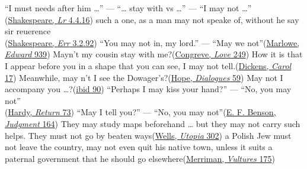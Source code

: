 \ea \label{ex:08-93}
\ea
``I must needs after him {\dots}'' --- ``{\dots} stay with vs {\dots}'' --- ``I may not {\dots}''\\\hfill(\href{https://internetshakespeare.uvic.ca/doc/Lr_F1/scene/4.4/index.html#tln-2400}{Shakespeare, \textit{Lr} 4.4.16}) %
\ex
such a one, as a man may not speake of, without he say sir reuerence\\\hfill(\href{https://internetshakespeare.uvic.ca/doc/Err_F1/scene/3.2/index.html#tln-880}{Shakespeare, \textit{Err} 3.2.92})
\ex
``You may not in, my lord.'' --- ``May we not''\hfill(\href{https://quod.lib.umich.edu/e/eebo/A07018.0001.001/1:2?rgn=div1;view=fulltext}{Marlowe, \textit{Edward} 939}) %
\ex
Mayn't my cousin stay with me?\hfill(\href{https://archive.org/details/in.ernet.dli.2015.219151/page/n187/mode/2up?q=%22mayn%27t+my+cousin%22&view=theater}{Congreve, \textit{Love} 249})
\ex
How it is that I appear before you in a shape that you can see, I may not tell.\hfill(\href{https://archive.org/details/christmascarol0000char_h5c8/page/36/mode/2up?q=%22I+may+not+tell%22&view=theater}{Dickens, \textit{Carol} 17}) %
\ex
Meanwhile, may n't I see the Dowager's?\hfill(\href{https://archive.org/details/dollydialogues00hope_0/page/88/mode/2up?view=theater&q=%22dowager%27s%22}{Hope, \textit{Dialogues} 59}) %
\ex
May not I accompany you {\dots}?\hfill(\href{https://archive.org/details/dollydialogues00hope_0/page/144/mode/2up?view=theater&q=%22may+not+I%22}{ibid 90}) %
\ex
``Perhaps I may kiss your hand?'' --- ``No, you may not''\\\hfill(\href{https://archive.org/details/returnofthenativ00harduoft/page/56/mode/2up?q=%22Perhaps+I+may%22&view=theater}{Hardy, \textit{Return} 73})
\ex
``May I tell you?'' --- ``No, you may not''\hfill(\href{https://archive.org/details/judgmentbookssto00bens/page/130/mode/2up?view=theater&q=%22may+i+tell+you%22}{E. F. Benson, \textit{Judgment} 164})
\ex
They may study maps beforehand {\dots} but they may not carry such helps. They must not go by beaten ways\hfill(\href{https://archive.org/details/modernutopi00well/page/302/mode/2up?view=theater&q=%22study+maps+beforehand%22}{Wells, \textit{Utopia} 302})
\ex \label{ex:8-may_must_not}
a Polish Jew must not leave the country, may not even quit his native town, unless it suits a paternal government that he should go elsewhere\hfill(\href{https://archive.org/details/vulturesnovel00merr/page/146/mode/2up?ref=ol&view=theater&q=%22polish+jew%22}{Merriman, \textit{Vultures} 175}) %
\z
\z

